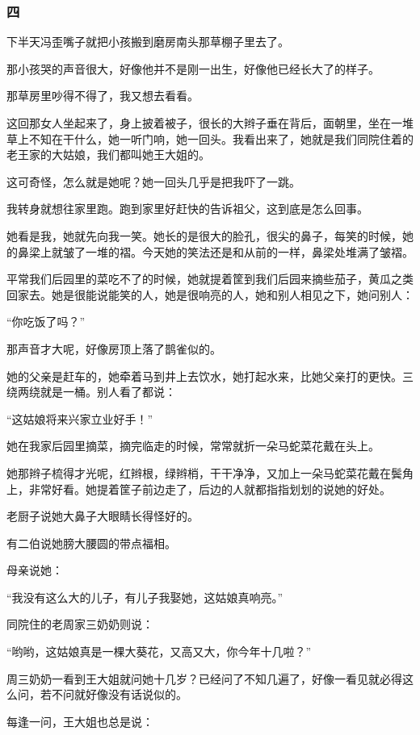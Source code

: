 \subsubsection*{四}
\par 下半天冯歪嘴子就把小孩搬到磨房南头那草棚子里去了。
\par 那小孩哭的声音很大，好像他并不是刚一出生，好像他已经长大了的样子。
\par 那草房里吵得不得了，我又想去看看。
\par 这回那女人坐起来了，身上披着被子，很长的大辫子垂在背后，面朝里，坐在一堆草上不知在干什么，她一听门响，她一回头。我看出来了，她就是我们同院住着的老王家的大姑娘，我们都叫她王大姐的。
\par 这可奇怪，怎么就是她呢？她一回头几乎是把我吓了一跳。
\par 我转身就想往家里跑。跑到家里好赶快的告诉祖父，这到底是怎么回事。
\par 她看是我，她就先向我一笑。她长的是很大的脸孔，很尖的鼻子，每笑的时候，她的鼻梁上就皱了一堆的褶。今天她的笑法还是和从前的一样，鼻梁处堆满了皱褶。
\par 平常我们后园里的菜吃不了的时候，她就提着筐到我们后园来摘些茄子，黄瓜之类回家去。她是很能说能笑的人，她是很响亮的人，她和别人相见之下，她问别人：
\par “你吃饭了吗？”
\par 那声音才大呢，好像房顶上落了鹊雀似的。
\par 她的父亲是赶车的，她牵着马到井上去饮水，她打起水来，比她父亲打的更快。三绕两绕就是一桶。别人看了都说：
\par “这姑娘将来兴家立业好手！”
\par 她在我家后园里摘菜，摘完临走的时候，常常就折一朵马蛇菜花戴在头上。
\par 她那辫子梳得才光呢，红辫根，绿辫梢，干干净净，又加上一朵马蛇菜花戴在鬓角上，非常好看。她提着筐子前边走了，后边的人就都指指划划的说她的好处。
\par 老厨子说她大鼻子大眼睛长得怪好的。
\par 有二伯说她膀大腰圆的带点福相。
\par 母亲说她：
\par “我没有这么大的儿子，有儿子我娶她，这姑娘真响亮。”
\par 同院住的老周家三奶奶则说：
\par “哟哟，这姑娘真是一棵大葵花，又高又大，你今年十几啦？”
\par 周三奶奶一看到王大姐就问她十几岁？已经问了不知几遍了，好像一看见就必得这么问，若不问就好像没有话说似的。
\par 每逢一问，王大姐也总是说：
